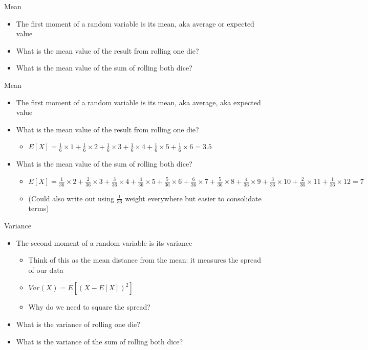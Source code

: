 \documentclass[aspectratio=169]{beamer}
\begin{document}
\begin{frame}{Mean}
    \begin{itemize}
        \item The first moment of a random variable is its mean, aka average or expected value
        \item What is the mean value of the result from rolling one die?
        \item What is the mean value of the sum of rolling both dice?
    \end{itemize}
\end{frame}

\begin{frame}{Mean}
    \begin{itemize}
        \item The first moment of a random variable is its mean, aka average, aka expected value
        \item What is the mean value of the result from rolling one die?
        \begin{itemize}
            \item $E[X] = \frac{1}{6} \times 1 + \frac{1}{6} \times 2 + \frac{1}{6} \times 3 + \frac{1}{6} \times 4 + \frac{1}{6} \times 5 + \frac{1}{6} \times 6 = 3.5$
        \end{itemize}
        \item What is the mean value of the sum of rolling both dice?
        \begin{itemize}
            \item $E[X] = \frac{1}{36} \times 2 + \frac{2}{36} \times 3 + \frac{3}{36} \times 4 + \frac{4}{36} \times 5 + \frac{5}{36} \times 6 + \frac{6}{36} \times 7 + \frac{5}{36} \times 8 + \frac{4}{36} \times 9 + \frac{3}{36} \times 10 + \frac{2}{36} \times 11 + \frac{1}{36} \times 12 = 7$
            \item (Could also write out using $\frac{1}{36}$ weight everywhere but easier to consolidate terms)
        \end{itemize}
    \end{itemize}
\end{frame}

\begin{frame}{Variance}
    \begin{itemize}
        \item The second moment of a random variable is its variance
        \begin{itemize}
            \item Think of this as the mean distance from the mean: it measures the spread of our data
            \item $Var(X) = E \left[ (X - E[X])^2 \right] $
            \item Why do we need to square the spread?
        \end{itemize}
        \item What is the variance of rolling one die?
        \item What is the variance of the sum of rolling both dice?
    \end{itemize}
\end{frame}
\end{document}
